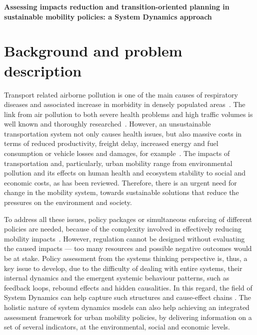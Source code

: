 \documentclass[a4paper,fontsize=11pt,bibliography=totoc]{scrartcl}
\newcommand{\titlemake}[2]{%
		\begin{center}
			\parbox{#1\linewidth}{\centering\Large\sffamily\bfseries{#2}}
		\end{center}
}
\begin{document}
\pagestyle{fancy}
\fancyhf{} %
\rhead{\footnotesize \today}
\rfoot{\footnotesize \thepage}

\titlemake{0.95}{ %
Assessing impacts reduction and transition-oriented planning in sustainable mobility policies: a System Dynamics approach
}

\section{Background and problem description}
\label{s:background}
Transport related airborne pollution is one of the main causes of respiratory diseases and associated increase in morbidity in densely populated areas~\parencite{vimercati2011_Trafficrelatedair,who2006_Airqualityguidelines}. The link from air pollution to both severe health problems and high traffic volumes is well known and thoroughly researched~\parencite{who2006_Airqualityguidelines}. However, an unsustainable transportation system not only causes health issues, but also massive costs in terms of reduced productivity, freight delay, increased energy and fuel consumption or vehicle losses and damages, for example~\parencite{li-zeng2012_SocialCostTraffic}. The impacts of transportation and, particularly, urban mobility range from environmental pollution and its effects on human health and ecosystem stability to social and economic costs, as has been reviewed. Therefore, there is an urgent need for change in the mobility system, towards sustainable solutions that reduce the pressures on the environment and society.

To address all these issues, policy packages or simultaneous enforcing of different policies are needed, because of the complexity involved in effectively reducing mobility impacts~\parencite[ch. 3, p. 45]{garciasierra2014_Travelbehaviourenvironmental}. However, regulation cannot be designed without evaluating the caused impacts --- too many resources and possible negative outcomes would be at stake. Policy assessment from the systems thinking perspective is, thus, a key issue to develop, due to the difficulty of dealing with entire systems, their internal dynamics and the emergent systemic behaviour patterns, such as feedback loops, rebound effects and hidden causalities. In this regard, the field of System Dynamics can help capture such structures and cause-effect chains \parencite{hjorth2006_Navigatingtowardssustainable}. The holistic nature of system dynamics models can also help achieving an integrated assessment framework for urban mobility policies, by delivering information on a set of several indicators, at the environmental, social and economic levels.
\end{document}
